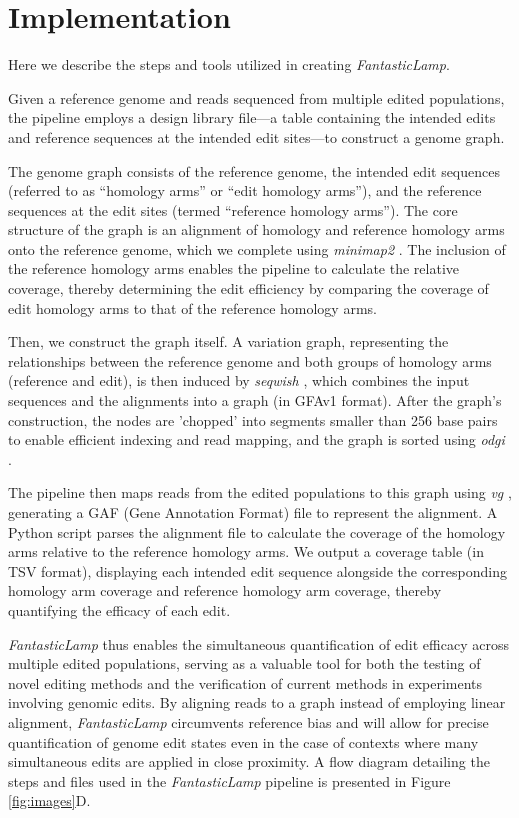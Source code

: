 \documentclass{bioinfo}
\theoremstyle{definition}
\begin{document}
\section*{Implementation}
\label{sec:implementation}
Here we describe the steps and tools utilized in creating \textit{FantasticLamp}.

Given a reference genome and reads sequenced from multiple edited populations, the pipeline employs a design library file---a table containing the intended edits and reference sequences at the intended edit sites---to construct a genome graph.

The genome graph consists of the reference genome, the intended edit sequences (referred to as ``homology arms'' or ``edit homology arms''), and the reference sequences at the edit sites (termed ``reference homology arms'').
The core structure of the graph is an alignment of homology and reference homology arms onto the reference genome, which we complete using \textit{minimap2} \citep{li2018minimap2}.
The inclusion of the reference homology arms enables the pipeline to calculate the relative coverage, thereby determining the edit efficiency by comparing the coverage of edit homology arms to that of the reference homology arms.

Then, we construct the graph itself.
A variation graph, representing the relationships between the reference genome and both groups of homology arms (reference and edit), is then induced by \textit{seqwish} \citep{garrison2023unbiased}, which combines the input sequences and the alignments into a graph (in GFAv1 format).
After the graph's construction, the nodes are 'chopped' into segments smaller than 256 base pairs to enable efficient indexing and read mapping, and the graph is sorted using \textit{odgi} \citep{guarracino2022odgi}.

The pipeline then maps reads from the edited populations to this graph using \textit{vg} \citep{garrison2018variation}, generating a GAF (Gene Annotation Format) file to represent the alignment.
A Python script parses the alignment file to calculate the coverage of the homology arms relative to the reference homology arms.
We output a coverage table (in TSV format), displaying each intended edit sequence alongside the corresponding homology arm coverage and reference homology arm coverage, thereby quantifying the efficacy of each edit.

\textit{FantasticLamp} thus enables the simultaneous quantification of edit efficacy across multiple edited populations, serving as a valuable tool for both the testing of novel editing methods and the verification of current methods in experiments involving genomic edits.
By aligning reads to a graph instead of employing linear alignment, \textit{FantasticLamp} circumvents reference bias and will allow for precise quantification of genome edit states even in the case of contexts where many simultaneous edits are applied in close proximity.
A flow diagram detailing the steps and files used in the \textit{FantasticLamp} pipeline is presented in Figure \ref{fig:images}D.
\end{document}
